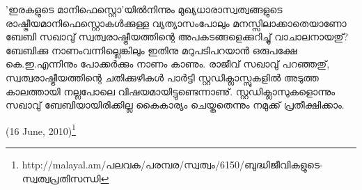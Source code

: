 'ഇരകളുടെ മാനിഫെസ്റ്റൊ'യില്‍നിന്നും മുഖ്യധാരാസ്വത്വങ്ങളുടെ രാഷ്ട്രീയമാനിഫെസ്റ്റൊകള്‍ക്കുള്ള വ്യത്യാസംപോലും 
മനസ്സിലാക്കാതെയാണോ ബേബി സഖാവു് സ്വത്വരാഷ്ട്രീയത്തിന്റെ അപകടങ്ങളെക്കുറിച്ചു് വാചാലനായതു്? ബേബിക്കു 
നാണംവന്നില്ലെങ്കിലും ഇതിനു മറുപടിപറയാന്‍ ഒരുപക്ഷേ കെ.ഇ.എന്നിനും പോക്കര്‍ക്കും നാണം കാണും. 
രാജീവ് സഖാവു് പറഞ്ഞതു്, സ്വത്വരാഷ്ട്രീയത്തിന്റെ ചതിക്കുഴികള്‍ പാര്‍ട്ടി സ്റ്റഡിക്ലാസ്സുകളില്‍ അടുത്ത 
കാലത്തായി നല്ലപോലെ വിഷയമായിട്ടുണ്ടെന്നാണു്. സ്റ്റഡിക്ലാസുകളൊന്നും സഖാവു് ബേബിയായിരിക്കില്ല കൈകാര്യം 
ചെയ്തതെന്നും നമുക്ക് പ്രതീക്ഷിക്കാം.

\begin{flushright}(16 June, 2010)\footnote{http://malayal.am/പലവക/പരമ്പര/സ്വത്വം/6150/ബുദ്ധിജീവികളുടെ-സ്വത്വപ്രതിസന്ധി}\end{flushright}

\newpage

